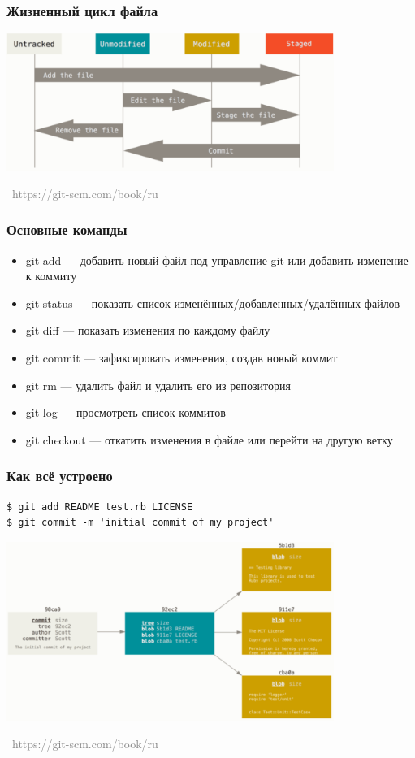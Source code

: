 \documentclass[xetex,mathserif,serif]{beamer}
\newcommand{\attribution}[1] {
    \vspace{-5mm}\begin{flushright}\begin{scriptsize}\textcolor{gray}{\textcopyright\, #1}\end{scriptsize}\end{flushright}
}
\begin{document}
    \begin{frame}
        \frametitle{Жизненный цикл файла}
        \begin{center}
            \includegraphics[width=0.8\textwidth]{fileLifeCycle.png}
            \attribution{https://git-scm.com/book/ru}
        \end{center}
    \end{frame}

    \begin{frame}
        \frametitle{Основные команды}
        \begin{itemize}
            \item git add --- добавить новый файл под управление git или добавить изменение к коммиту
            \item git status --- показать список изменённых/добавленных/удалённых файлов
            \item git diff --- показать изменения по каждому файлу
            \item git commit --- зафиксировать изменения, создав новый коммит
            \item git rm --- удалить файл и удалить его из репозитория
            \item git log --- просмотреть список коммитов
            \item git checkout --- откатить изменения в файле или перейти на другую ветку
        \end{itemize}
    \end{frame}

    \begin{frame}[fragile]
        \frametitle{Как всё устроено}
        \begin{verbatim}
$ git add README test.rb LICENSE
$ git commit -m 'initial commit of my project'
        \end{verbatim}
        \begin{center}
            \includegraphics[width=0.8\textwidth]{blobs.png}
            \attribution{https://git-scm.com/book/ru}
        \end{center}
    \end{frame}
\end{document}
